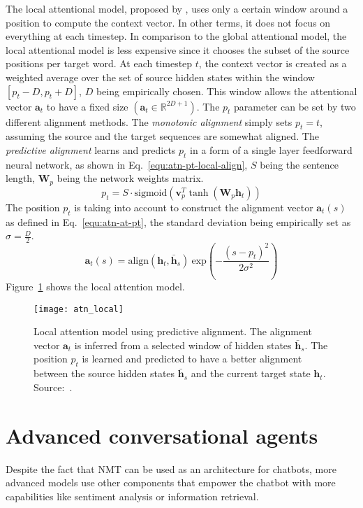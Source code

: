 The local attentional model, proposed by \citet{1508.04025}, uses only a certain window around a position to compute the context vector. In other terms, it does not focus on everything at each timestep. In comparison to the global attentional model, the local attentional model is less expensive since it chooses the subset of the source positions per target word. At each timestep $t$, the context vector is created as a weighted average over the set of source hidden states within the window $[p_t - D, p_t + D]$, $D$ being empirically chosen.
This window allows the attentional vector $\bm{a}_t$ to have a fixed size $(\bm{a}_t \in \mathbb{R}^{2D+1})$. The $p_t$ parameter can be set by two different alignment methods. The \textit{monotonic alignment} simply sets $p_t = t$, assuming the source and the target sequences are somewhat aligned. The \textit{predictive alignment} learns and predicts $p_t$ in a form of a single layer feedforward neural network, as shown in Eq.~\ref{equ:atn-pt-local-align}, $S$ being the sentence length, $\mathbf{W}_p$ being the network weights matrix.
\begin{equation}
    p_t = S \cdot \mathrm{sigmoid} ( \bm{v}_p^T \tanh ( \mathbf{W}_p \bm{h}_t))
    \label{equ:atn-pt-local-align}
\end{equation}
The position $p_t$ is taking into account to construct the alignment vector $\bm{a}_t(s)$ as defined in Eq.~\ref{equ:atn-at-pt}, the standard deviation being empirically set as $\sigma = \frac{D}{2}$.
\begin{equation}
    \bm{a}_t(s) = \mathrm{align}(\bm{h}_t, \bm{\bar{h}}_s) \ \mathrm{exp}(- \frac{(s - p_t)^2}{2\sigma^2})
    \label{equ:atn-at-pt}
\end{equation}
Figure~\ref{fig:atn-local} shows the local attention model.
\begin{figure}
    \centering
    \texttt{[image: atn\_local]}
    \decoRule
    \caption[Local attention model]{Local attention model using predictive alignment. The alignment vector $\bm{a}_t$ is inferred from a selected window of hidden states $\bm{\bar{h}}_s$. The position $p_t$ is learned and predicted to have a better alignment between the source hidden states $\bm{\bar{h}}_s$ and the current target state $\bm{h}_t$. Source:~\citet{1508.04025}.}
    \label{fig:atn-local}
\end{figure}

\section{Advanced conversational agents}
Despite the fact that NMT can be used as an architecture for chatbots, more advanced models use other components that empower the chatbot with more capabilities like sentiment analysis or information retrieval.


